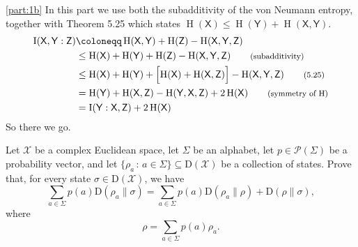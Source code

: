 \documentclass[boxes,pages,color=SeaGreen]{homework}
\newcommand{\X}{\mathcal{X}}
\renewcommand{\P}{\mathcal{P}}
\newcommand{\reg}[1]{\mathsf{#1}}
\newcommand{\ent}{\operatorname{H}}
\newcommand{\mutIn}[2]{\operatorname{I} (#1: #2)}
\newcommand{\smalltag}[1]{\tag*{\footnotesize (#1)}}
\newcommand{\Density}{\mathrm{D}}
\begin{document}
\begin{solution}
    \ref{part:1b}
    In this part we use both the subadditivity of the von Neumann entropy, together with Theorem 5.25 which states $\ent(\reg{X}) \leq \ent(\reg{Y}) + \ent(\reg{X}, \reg{Y})$.
    \begin{align*}
        \mutIn{\reg{X}, \reg{Y}}{\reg{Z}} & \defeq \ent(\reg{X}, \reg{Y}) + \ent(\reg{Z}) - \ent(\reg{X}, \reg{Y}, \reg{Z})                                                         \\
                                          & \leq \ent(\reg{X}) + \ent(\reg{Y}) + \ent(\reg{Z}) - \ent(\reg{X}, \reg{Y}, \reg{Z}) \smalltag{subadditivity}                           \\
                                          & \leq \ent(\reg{X}) + \ent(\reg{Y}) + \qty\Big[\ent(\reg{X}) + \ent(\reg{X}, \reg{Z})] - \ent(\reg{X}, \reg{Y}, \reg{Z}) \smalltag{5.25} \\
                                          & = \ent(\reg{Y}) + \ent(\reg{X}, \reg{Z}) - \ent(\reg{Y}, \reg{X}, \reg{Z}) + 2\ent(\reg{X}) \smalltag{symmetry of $\ent$}               \\
                                          & = \mutIn{\reg{Y}}{\reg{X},\reg{Z}} + 2\ent(\reg{X})
    \end{align*}
    So there we go.
\end{solution}


\begin{problem}
Let $\X$ be a complex Euclidean space,
let $\Sigma$ be an alphabet,
let $p\in\P(\Sigma)$ be a probability vector, and
let $\{\rho_a\,:\,a\in\Sigma\}\subseteq\Density(\X)$ be a collection of
states.
Prove that, for every state $\sigma\in\Density(\X)$, we have
\[
    \sum_{a\in\Sigma} p(a) \mathrm{D}(\rho_a \| \sigma)
    = \sum_{a\in\Sigma} p(a) \mathrm{D}(\rho_a \| \rho) +
    \mathrm{D}(\rho \| \sigma),
\]
where
\[
    \rho = \sum_{a\in\Sigma} p(a) \rho_a.
\]
\end{problem}
\end{document}
